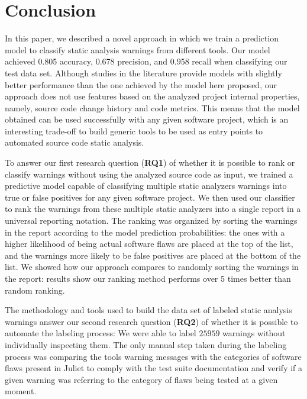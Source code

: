 \chapter{Conclusion}
\label{ch:conclusion}

In this paper, we described a novel approach in which we train a prediction
model to classify static analysis warnings from different tools. Our model
achieved 0.805 accuracy, 0.678 precision, and 0.958 recall when classifying our
test data set.  Although studies in the literature provide models with slightly
better performance than the one achieved by the model here proposed, our
approach does not use features based on the analyzed project internal
properties, namely, source code change history and code metrics. This means
that the model obtained can be used successfully with any given software
project, which is an interesting trade-off to build generic tools to be used as
entry points to automated source code static analysis.

To answer our first research question (\textbf{RQ1}) of whether it is possible to rank or classify warnings
without using the analyzed source code as input, we trained a predictive model
capable of classifying multiple static analyzers warnings into true or false
positives for any given software project.
We then used our classifier to rank the warnings from these multiple static
analyzers into a single report in a universal reporting notation. The ranking
was organized by sorting the warnings in the report according to the model
prediction probabilities: the ones with a higher likelihood of being actual
software flaws are placed at the top of the list, and the warnings more likely
to be false positives are placed at the bottom of the list. We showed how our
approach compares to randomly sorting the warnings in the report: results show
our ranking method performs over 5 times better than random ranking.


The methodology and tools used to build the data set of labeled static analysis
warnings answer our second research question (\textbf{RQ2}) of whether it is
possible to automate the labeling process: We were able to 
label $25959$ warnings without individually inspecting them. The only manual step
taken during the labeling process was comparing the tools warning messages with
the categories of software flaws present in Juliet to comply with the test suite
documentation and verify if a given warning was referring to the category of flaws
being tested at a given moment.

